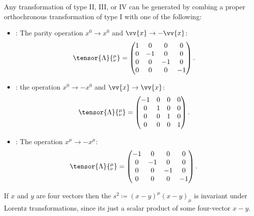 Any transformation of type II, III, or IV can be generated by combing a proper orthochronous transformation of type I with one of the following:
\begin{itemize}
    \item {}: The parity operation \(x^0 \to x^0\) and \(\vv{x} \to -\vv{x}\):
    \begin{equation}
        \tensor{\Lambda}{^\mu_\nu} = 
        \begin{pmatrix}
            1 & 0 & 0 & 0\\
            0 & -1 & 0 & 0\\
            0 & 0 & -1 & 0\\
            0 & 0 & 0 & -1
        \end{pmatrix}
        .
    \end{equation}
    \item {}: the operation \(x^0 \to -x^0\) and \(\vv{x} \to \vv{x}\):
    \begin{equation}
        \tensor{\Lambda}{^\mu_\nu} =
        \begin{pmatrix}
            -1 & 0 & 0 & 0\\
            0 & 1 & 0 & 0\\
            0 & 0 & 1 & 0\\
            0 & 0 & 0 & 1
        \end{pmatrix}
        .
    \end{equation}
    \item {}: The operation \(x^\mu \to -x^\mu\):
    \begin{equation}
        \tensor{\Lambda}{^\mu_\nu} =
        \begin{pmatrix}
            -1 & 0 & 0 & 0\\
            0 & -1 & 0 & 0\\
            0 & 0 & -1 & 0\\
            0 & 0 & 0 & -1
        \end{pmatrix}
        .
    \end{equation}
\end{itemize}

If \(x\) and \(y\) are four vectors then the  \(s^2 \coloneqq (x - y)^\mu(x - y)_\mu\) is invariant under Lorentz transformations, since its just a scalar product of some four-vector \(x - y\).

